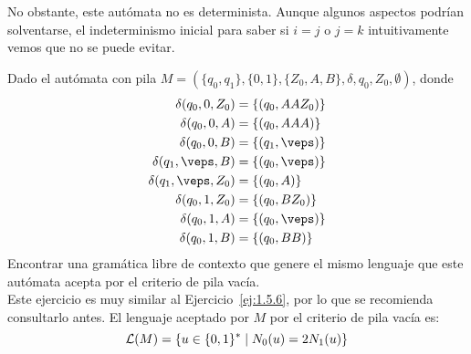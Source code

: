 \begin{ejercicio}
\begin{enumerate}
        No obstante, este autómata no es determinista. Aunque algunos aspectos podrían solventarse, el indeterminismo inicial para saber si $i=j$ o $j=k$ intuitivamente vemos que no se puede evitar.
    \end{enumerate}
\end{ejercicio}

\begin{ejercicio}\label{ej:1.5.13}
    Dado el autómata con pila $M = (\{q_0,q_1\},\{0,1\},\{Z_0,A,B\},\delta,q_0,Z_0,\emptyset )$, donde
    \begin{align*}
        \delta(q_0,0,Z_0) &= \{(q_0,AAZ_0)\}\\
        \delta(q_0,0,A) &= \{(q_0,AAA)\}\\
        \delta(q_0,0,B) &= \{(q_1,\veps)\}\\
        \delta(q_1,\veps,B) &= \{(q_0,\veps)\}\\
        \delta(q_1,\veps,Z_0) &= \{(q_0,A)\}\\
        \delta(q_0,1,Z_0) &= \{(q_0,BZ_0)\}\\
        \delta(q_0,1,A) &= \{(q_0,\veps)\}\\
        \delta(q_0,1,B) &= \{(q_0,BB)\}
    \end{align*}
    Encontrar una gramática libre de contexto que genere el mismo lenguaje que este autómata acepta por el criterio de pila vacía.\\

    Este ejercicio es muy similar al Ejercicio~\ref{ej:1.5.6}, por lo que se recomienda consultarlo antes. El lenguaje aceptado por $M$ por el criterio de pila vacía es:
    \begin{equation*}
        \mathcal{L}(M)=\{u\in \{0,1\}^\ast \mid N_0(u) = 2N_1(u)\}
    \end{equation*}

\end{ejercicio}

